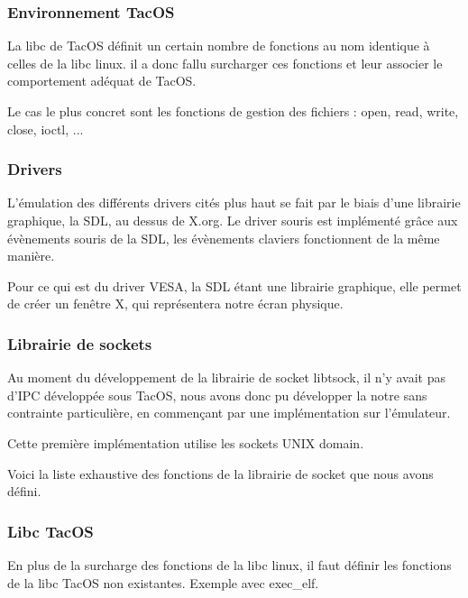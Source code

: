 \subsubsection{Environnement TacOS}

La libc de TacOS définit un certain nombre de fonctions au nom identique à celles de la libc linux. il a donc fallu surcharger ces fonctions et leur associer le comportement adéquat de TacOS.

Le cas le plus concret sont les fonctions de gestion des fichiers : open, read, write, close, ioctl, ...


\subsubsection{Drivers}

L'émulation des différents drivers cités plus haut se fait par le biais d'une librairie graphique, la SDL, au dessus de X.org. Le driver souris est implémenté grâce aux évènements souris de la SDL, les évènements claviers fonctionnent de la même manière. 

Pour ce qui est du driver VESA, la SDL étant une librairie graphique, elle permet de créer un fenêtre X, qui représentera notre écran physique. 


\subsubsection{Librairie de sockets}

Au moment du développement de la librairie de socket libtsock, il n'y avait pas d'IPC développée sous TacOS, nous avons donc pu développer la notre sans contrainte particulière, en commençant par une implémentation sur l'émulateur. 

Cette première implémentation utilise les sockets UNIX domain.

Voici la liste exhaustive des fonctions de la librairie de socket que nous avons défini.



\subsubsection{Libc TacOS}

En plus de la surcharge des fonctions de la libc linux, il faut définir les fonctions de la libc TacOS non existantes. Exemple avec exec\_elf.

